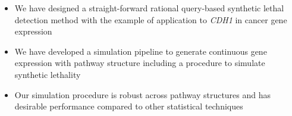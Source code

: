       \begin{itemize}
      \item We have designed a straight-forward rational query-based synthetic lethal detection method with the example of application to \textit{CDH1} in cancer gene expression
      
      \bigskip
      
      \item We have developed a simulation pipeline to generate continuous gene expression with pathway structure including a procedure to simulate synthetic lethality 
      
      \bigskip
      
      \item Our simulation procedure is robust across pathway structures and has desirable performance compared to other statistical techniques 
      \end{itemize}
 \fi